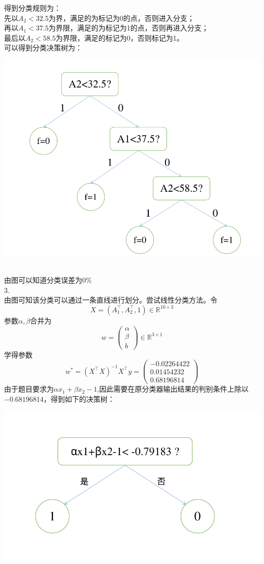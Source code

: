 \documentclass[answers]{exam}  %
\begin{document}
\begin{questions}
\begin{solution}
        得到分类规则为：\\
        先以$A_2<32.5$为界，满足的为标记为0的点，否则进入分支；\\
        再以$A_1<37.5$为界限，满足的为标记为1的点，否则再进入分支；\\
        最后以$A_2< 58.5$为界限，满足的标记为0，否则标记为1。\\
        可以得到分类决策树为：\\
        \centerline{\includegraphics[width=0.82\linewidth]{5.3.png}}\\
        由图可以知道分类误差为0\%\\
        3.\\
        由图可知该分类可以通过一条直线进行划分。尝试线性分类方法。令
        $$X =
        \left(
            A_1^{\top},A_2^\top,1\right)\in\mathbb R^{10\times3}$$
        参数$\alpha,\beta$合并为
        $$ w=
        \left( 
            \begin{matrix}
             \alpha\\
             \beta \\
             b  
            \end{matrix}
        \right)\in\mathbb R^{3\times1}
        $$
        学得参数
        $$
        w^*=(X^\top X)^{-1}X^\top y=\left(
            \begin{matrix}
                -0.02264422\\
                0.01454232\\
                0.68196814
        \end{matrix} \right)
        $$
        由于题目要求为$\alpha x_1+\beta x_2-1$,因此需要在原分类器输出结果的判别条件上除以$-0.68196814$，得到如下的决策树：\\
        \centerline{\includegraphics[width=0.82\linewidth]{5.4.png}}\\

\end{solution}
\end{questions}
\end{document}
